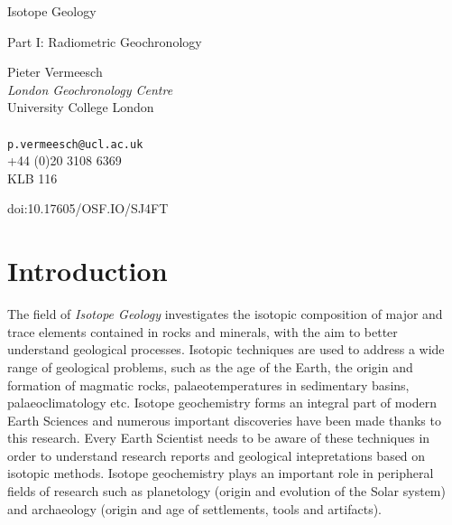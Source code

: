\documentclass{book}
\begin{document}
\begin{titlepage}
  \centering
  \vfill
  \begin{Huge}
    Isotope Geology\\
  \end{Huge}
  \vspace{1cm}
  \begin{huge}
  Part I: Radiometric Geochronology\\
  \end{huge}
  \vspace{2cm}
  \begin{large}
  Pieter Vermeesch\\
  \textit{London Geochronology Centre}\\
  University College London \\~\\
  \texttt{p.vermeesch@ucl.ac.uk} \\
  +44 (0)20 3108 6369\\
  KLB 116
  \end{large}
  \vfill
  doi:10.17605/OSF.IO/SJ4FT
\end{titlepage}

\tableofcontents

\chapter{Introduction}
\label{sec:intro}

The field of \emph{Isotope Geology} investigates the isotopic
composition of major and trace elements contained in rocks and
minerals, with the aim to better understand geological processes.
Isotopic techniques are used to address a wide range of geological
problems, such as the age of the Earth, the origin and formation of
magmatic rocks, palaeotemperatures in sedimentary basins,
palaeoclimatology etc.  Isotope geochemistry forms an integral part of
modern Earth Sciences and numerous important discoveries have been
made thanks to this research.  Every Earth Scientist needs to be aware
of these techniques in order to understand research reports and
geological intepretations based on isotopic methods. Isotope
geochemistry plays an important role in peripheral fields of research
such as planetology (origin and evolution of the Solar system) and
archaeology (origin and age of settlements, tools and artifacts).\\
\end{document}
